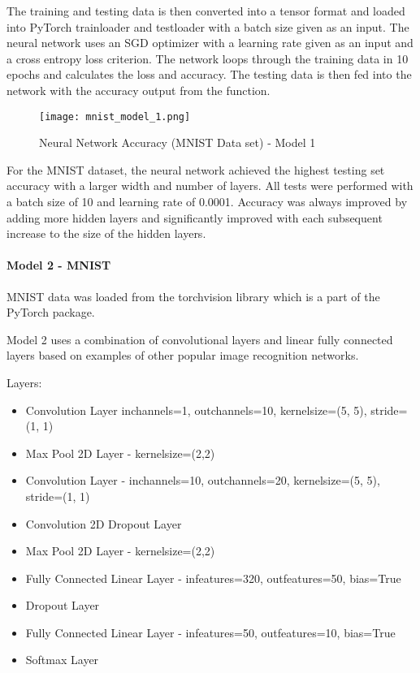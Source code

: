 \documentclass[12pt]{article}
\begin{document}
The training and testing data is then converted into a tensor format and loaded into PyTorch trainloader and testloader with a batch size given as an input.  The neural network uses an SGD optimizer with a learning rate given as an input and a cross entropy loss criterion. The network loops through the training data in 10 epochs and calculates the loss and accuracy. The testing data is then fed into the network with the accuracy output from the function.

\begin{figure}[H]
	\texttt{[image: mnist\_model\_1.png]}
	\caption{Neural Network Accuracy (MNIST Data set) - Model 1}
\end{figure}

For the MNIST dataset, the neural network achieved the highest testing set accuracy with a larger width and number of layers. All tests were performed with a batch size of 10 and learning rate of 0.0001. Accuracy was always improved by adding more hidden layers and significantly improved with each subsequent increase to the size of the hidden layers.

\paragraph{Model 2 - MNIST}

MNIST data was loaded from the torchvision library which is a part of the PyTorch package.

Model 2 uses a combination of convolutional layers and linear fully connected layers based on examples of other popular image recognition networks.

Layers:
\begin{itemize}
\item Convolution Layer  inchannels=1, outchannels=10, kernelsize=(5, 5), stride=(1, 1)
\item Max Pool 2D Layer - kernelsize=(2,2)
\item Convolution Layer -  inchannels=10, outchannels=20, kernelsize=(5, 5), stride=(1, 1)
\item Convolution 2D Dropout Layer
\item Max Pool 2D Layer - kernelsize=(2,2)
\item Fully Connected Linear Layer - infeatures=320, outfeatures=50, bias=True
\item Dropout Layer
\item Fully Connected Linear Layer - infeatures=50, outfeatures=10, bias=True
\item Softmax Layer
\end{itemize}
\end{document}
